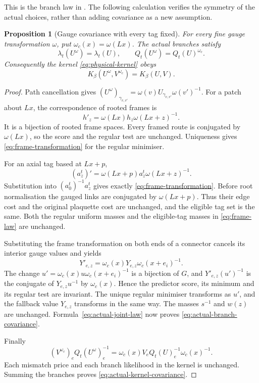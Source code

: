 \documentclass[11pt,reqno]{amsart}
\numberwithin{equation}{section}
\newtheorem{proposition}[theorem]{Proposition}
\theoremstyle{definition}
\theoremstyle{remark}
\begin{document}
This is the branch law in \cite[(14.12), p.~60]{Main}.
The following calculation verifies the symmetry of the actual
choices, rather than adding covariance as a new assumption.

\begin{proposition}[Gauge covariance with every tag fixed]
\label{prop:actual-branch-covariance}
For every fine gauge transformation \(\omega\), put
\(\omega_c(x)=\omega(Lx)\). The actual branches satisfy
\begin{equation}
 \lambda_t(U^\omega)=\lambda_t(U),\qquad
 Q_t(U^\omega)=Q_t(U)^{\omega_c}.
 \label{eq:actual-branch-covariance}
\end{equation}
Consequently the kernel \eqref{eq:physical-kernel} obeys
\begin{equation}
                  K_\beta(U^\omega,V^{\omega_c})=K_\beta(U,V).
 \label{eq:actual-kernel-covariance}
\end{equation}
\end{proposition}
\begin{proof}
Path cancellation gives
\((U^\omega)_{\gamma_{v,v'}}=\omega(v)U_{\gamma_{v,v'}}\omega(v')^{-1}\).
For a patch about \(Lx\), the correspondence of rooted frames is
\begin{equation}
       h'_z=\omega(Lx)h_z\omega(Lx+z)^{-1}.
 \label{eq:frame-transformation}
\end{equation}
It is a bijection of rooted frame spaces. Every framed route is
conjugated by \(\omega(Lx)\), so the score and the regular test
are unchanged. Uniqueness gives \eqref{eq:frame-transformation}
for the regular minimiser.

For an axial tag based at \(Lx+p\),
\[
       (a_z^t)'=\omega(Lx+p)a_z^t\omega(Lx+z)^{-1}.
\]
Substitution into \((a_0^t)^{-1}a_z^t\) gives exactly
\eqref{eq:frame-transformation}. Before root normalisation the
gauged links are conjugated by \(\omega(Lx+p)\). Thus their
edge cost and the original plaquette cost are unchanged, and
the eligible tag set is the same. Both the regular uniform masses
and the eligible-tag masses in \eqref{eq:frame-law} are unchanged.

Substituting the frame transformation on both ends of a connector
cancels its interior gauge values and yields
\begin{equation}
             Y'_{e,z}=\omega_c(x)Y_{e,z}\omega_c(x+e_i)^{-1}.
 \label{eq:connector-transformation}
\end{equation}
The change \(u'=\omega_c(x)u\omega_c(x+e_i)^{-1}\) is a bijection
of \(G\), and \(Y'_{e,z}(u')^{-1}\) is the conjugate of
\(Y_{e,z}u^{-1}\) by \(\omega_c(x)\). Hence the predictor score,
its minimum and its regular test are invariant. The unique regular
minimiser transforms as \(u'\), and the fallback value \(Y_{e,z}\)
transforms in the same way. The masses \(s^{-1}\) and \(w(z)\)
are unchanged. Formula~\eqref{eq:actual-joint-law} now proves
\eqref{eq:actual-branch-covariance}.

Finally
\[
        (V^{\omega_c})_eQ_t(U^\omega)_e^{-1}
         =\omega_c(x)V_eQ_t(U)_e^{-1}\omega_c(x)^{-1}.
\]
Each mismatch price and each branch likelihood in the kernel
is unchanged. Summing the branches proves
\eqref{eq:actual-kernel-covariance}.
\end{proof}
\end{document}
